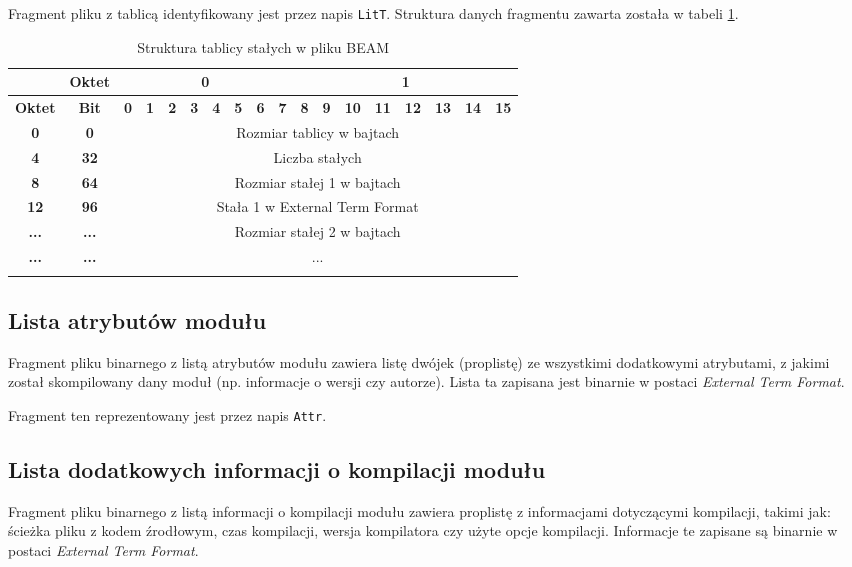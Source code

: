 Fragment pliku z tablicą identyfikowany jest przez napis \texttt{LitT}. Struktura danych fragmentu zawarta została w tabeli \ref{table:literaltable}.

\begin{longtable}{|c|c|c|c|c|c|c|c|c|c|c|c|c|c|c|c|c|c|}
\hline
         & \textbf{Oktet} & \multicolumn{8}{|c|}{\textbf{0}} & \multicolumn{8}{|c|}{\textbf{1}} \\
\hline
\textbf{Oktet} & \textbf{Bit} & \textbf{0} & \textbf{1} & \textbf{2} & \textbf{3} & \textbf{4} & \textbf{5} & \textbf{6} & \textbf{7} & \textbf{8} & \textbf{9} & \textbf{10} & \textbf{11} & \textbf{12} & \textbf{13} & \textbf{14} & \textbf{15}\\
\hline
\textbf{0} & \textbf{0} & \multicolumn{16}{|c|}{Rozmiar tablicy w bajtach} \\[3ex]
\hline
\textbf{4} & \textbf{32} & \multicolumn{16}{|c|}{Liczba stałych}\\[3ex]
\hline
\textbf{8} & \textbf{64} & \multicolumn{16}{|c|}{Rozmiar stałej 1 w bajtach} \\[3ex]
\hline
\textbf{12} & \textbf{96} & \multicolumn{16}{|c|}{Stała 1 w External Term Format}\\[8ex]
\hline
\textbf{...} & \textbf{...} & \multicolumn{16}{|c|}{Rozmiar stałej 2 w bajtach}\\[3ex]
\hline
\textbf{...} & \textbf{...} & \multicolumn{16}{|c|}{...}\\[8ex]
\hline
\caption{Struktura tablicy stałych w pliku BEAM}
\label{table:literaltable} \\
\end{longtable}

\subsection{Lista atrybutów modułu}
Fragment pliku binarnego z listą atrybutów modułu zawiera listę dwójek (proplistę) ze wszystkimi dodatkowymi atrybutami, z jakimi został skompilowany dany moduł (np. informacje o wersji czy autorze). Lista ta zapisana jest binarnie w postaci \emph{External Term Format}.

Fragment ten reprezentowany jest przez napis \texttt{Attr}.

\subsection{Lista dodatkowych informacji o kompilacji modułu}
Fragment pliku binarnego z listą informacji o kompilacji modułu zawiera proplistę z informacjami dotyczącymi kompilacji, takimi jak: ścieżka pliku z kodem źrodłowym, czas kompilacji, wersja kompilatora czy użyte opcje kompilacji. Informacje te zapisane są binarnie w postaci \emph{External Term Format}.

